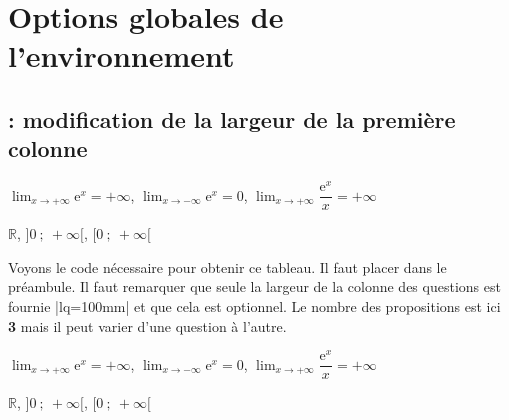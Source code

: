 \section{Options globales de l'environnement  }

\subsection{ : modification de la largeur de la première colonne }

\begin{alterqcm}[long,lq=110mm]
{{$\displaystyle\lim_{x \to +\infty} \text{e}^x = + \infty$},
{$\displaystyle\lim_{x \to -\infty} \text{e}^x = 0$},
{$\displaystyle\lim_{x \to +\infty} \dfrac{\text{e}^x}{x} = + \infty$}}

{{$\mathbb{R}$},
{$\big]0~;~+ \infty\big[$},
{$\big[0~;~+\infty\big[$}
}
\end{alterqcm}

\medskip
Voyons le code nécessaire pour obtenir ce tableau. Il faut  placer
 dans le préambule. Il faut remarquer que seule la largeur de la colonne des questions est fournie |lq=100mm| et que cela est optionnel. Le nombre des propositions est ici \textbf{3} mais il peut varier d'une question à l'autre.

\begin{tkzexample}
 \begin{alterqcm}[long,lq=110mm]
  {{$\displaystyle\lim_{x \to +\infty} \text{e}^x = + \infty$},
  {$\displaystyle\lim_{x \to -\infty} \text{e}^x = 0$},
  {$\displaystyle\lim_{x \to +\infty} \dfrac{\text{e}^x}{x} = + \infty$}}
  
  {{$\mathbb{R}$},
  {$\big]0~;~+ \infty\big[$},
  {$\big[0~;~+\infty\big[$}
  }
  \end{alterqcm}\end{tkzexample}



